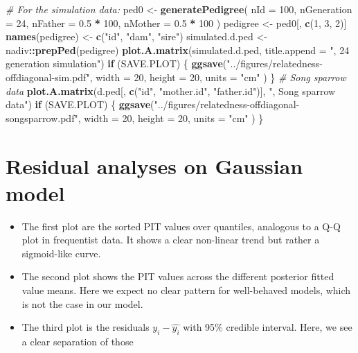 \documentclass[
]{article}
\newenvironment{Shaded}{\begin{snugshade}}{\end{snugshade}}
\newcommand{\AttributeTok}[1]{\textcolor[rgb]{0.13,0.29,0.53}{#1}}
\newcommand{\CommentTok}[1]{\textcolor[rgb]{0.56,0.35,0.01}{\textit{#1}}}
\newcommand{\ControlFlowTok}[1]{\textcolor[rgb]{0.13,0.29,0.53}{\textbf{#1}}}
\newcommand{\DecValTok}[1]{\textcolor[rgb]{0.00,0.00,0.81}{#1}}
\newcommand{\FloatTok}[1]{\textcolor[rgb]{0.00,0.00,0.81}{#1}}
\newcommand{\FunctionTok}[1]{\textcolor[rgb]{0.13,0.29,0.53}{\textbf{#1}}}
\newcommand{\NormalTok}[1]{#1}
\newcommand{\OtherTok}[1]{\textcolor[rgb]{0.56,0.35,0.01}{#1}}
\newcommand{\SpecialCharTok}[1]{\textcolor[rgb]{0.81,0.36,0.00}{\textbf{#1}}}
\newcommand{\StringTok}[1]{\textcolor[rgb]{0.31,0.60,0.02}{#1}}
\providecommand{\tightlist}{%
  \setlength{\itemsep}{0pt}\setlength{\parskip}{0pt}}
\begin{document}
\begin{Shaded}
\begin{Highlighting}[]
\CommentTok{\# For the simulation data:}
\NormalTok{ped0 }\OtherTok{\textless{}{-}} \FunctionTok{generatePedigree}\NormalTok{(}
  \AttributeTok{nId =} \DecValTok{100}\NormalTok{, }\AttributeTok{nGeneration =} \DecValTok{24}\NormalTok{,}
  \AttributeTok{nFather =} \FloatTok{0.5} \SpecialCharTok{*} \DecValTok{100}\NormalTok{, }\AttributeTok{nMother =} \FloatTok{0.5} \SpecialCharTok{*} \DecValTok{100}
\NormalTok{)}
\NormalTok{pedigree }\OtherTok{\textless{}{-}}\NormalTok{ ped0[, }\FunctionTok{c}\NormalTok{(}\DecValTok{1}\NormalTok{, }\DecValTok{3}\NormalTok{, }\DecValTok{2}\NormalTok{)]}
\FunctionTok{names}\NormalTok{(pedigree) }\OtherTok{\textless{}{-}} \FunctionTok{c}\NormalTok{(}\StringTok{"id"}\NormalTok{, }\StringTok{"dam"}\NormalTok{, }\StringTok{"sire"}\NormalTok{)}
\NormalTok{simulated.d.ped }\OtherTok{\textless{}{-}}\NormalTok{ nadiv}\SpecialCharTok{::}\FunctionTok{prepPed}\NormalTok{(pedigree)}
\FunctionTok{plot.A.matrix}\NormalTok{(simulated.d.ped,}
              \AttributeTok{title.append =} \StringTok{", 24 generation simulation"}\NormalTok{)}
\ControlFlowTok{if}\NormalTok{ (SAVE.PLOT) \{}
  \FunctionTok{ggsave}\NormalTok{(}\StringTok{"../figures/relatedness{-}offdiagonal{-}sim.pdf"}\NormalTok{,}
    \AttributeTok{width =} \DecValTok{20}\NormalTok{, }\AttributeTok{height =} \DecValTok{20}\NormalTok{, }\AttributeTok{units =} \StringTok{"cm"}
\NormalTok{  )}
\NormalTok{\}}
\CommentTok{\# Song sparrow data}
\FunctionTok{plot.A.matrix}\NormalTok{(d.ped[, }\FunctionTok{c}\NormalTok{(}\StringTok{"id"}\NormalTok{, }\StringTok{"mother.id"}\NormalTok{, }\StringTok{"father.id"}\NormalTok{)],}
              \StringTok{", Song sparrow data"}\NormalTok{)}
\ControlFlowTok{if}\NormalTok{ (SAVE.PLOT) \{}
  \FunctionTok{ggsave}\NormalTok{(}\StringTok{"../figures/relatedness{-}offdiagonal{-}songsparrow.pdf"}\NormalTok{,}
    \AttributeTok{width =} \DecValTok{20}\NormalTok{, }\AttributeTok{height =} \DecValTok{20}\NormalTok{, }\AttributeTok{units =} \StringTok{"cm"}
\NormalTok{  )}
\NormalTok{\}}
\end{Highlighting}
\end{Shaded}

\hypertarget{residual-analyses-on-gaussian-model}{%
\section*{Residual analyses on Gaussian
model}\label{residual-analyses-on-gaussian-model}}

\begin{itemize}
\tightlist
\item
  The first plot are the sorted PIT values over quantiles, analogous to
  a Q-Q plot in frequentist data. It shows a clear non-linear trend but
  rather a sigmoid-like curve.
\item
  The second plot shows the PIT values across the different posterior
  fitted value means. Here we expect no clear pattern for well-behaved
  models, which is not the case in our model.
\item
  The third plot is the residuals \(y_i - \hat{y_i}\) with 95\% credible
  interval. Here, we see a clear separation of those
\end{itemize}
\end{document}
